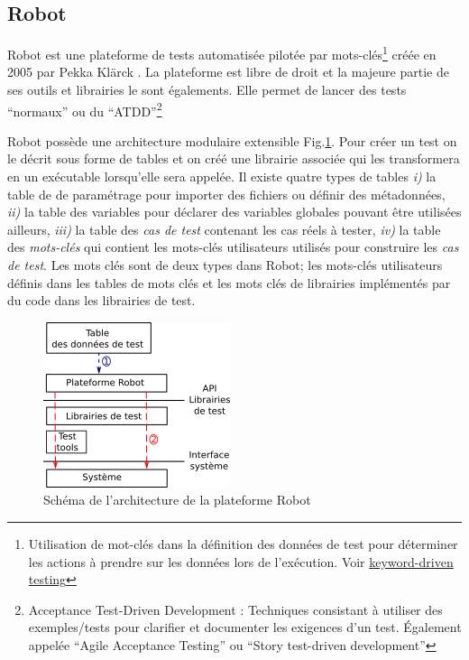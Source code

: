 \subsection{Robot}
\label{subsection:Robot}

Robot \citep{ROBOT_web} est une plateforme de tests automatisée pilotée par mots-clés\footnote{Utilisation de mot-clés dans la définition des données de test pour déterminer les actions à prendre sur les données lors de l'exécution. Voir \href{https://en.wikipedia.org/wiki/Keyword-driven\_testing}{keyword-driven testing}} créée en 2005 par Pekka Klärck \citep{ROBOTlaukkanen2006data}. La plateforme est libre de droit et la majeure partie de ses outils et librairies le sont égalements. Elle permet de lancer des tests ``normaux'' ou du ``ATDD''\footnote{Acceptance Test-Driven Development \citep{ROBOTlarman2010practices}: Techniques consistant à utiliser des exemples/tests pour clarifier et documenter les exigences d'un test. Également appelée ``Agile Acceptance Testing'' ou ``Story test-driven development''}

Robot possède une architecture modulaire extensible
Fig.\ref{Robot_arch}.  Pour créer un test on le décrit sous forme de
tables et on créé une librairie associée qui les transformera en un
exécutable lorsqu'elle sera appelée. Il existe quatre types de tables
\textit{i)} la table de de paramétrage pour importer des fichiers ou
définir des métadonnées, \textit{ii)} la table des variables pour
déclarer des variables globales pouvant être utilisées ailleurs,
\textit{iii)} la table des \textit{cas de test} contenant les cas
réels à tester, \textit{iv)} la table des \textit{mots-clés} qui
contient les mots-clés utilisateurs utilisés pour construire les
\textit{cas de test}.  Les mots clés sont de deux types dans Robot;
les mots-clés utilisateurs définis dans les tables de mots clés et les
mots clés de librairies implémentés par du code dans les librairies de
test.

\begin{figure}[H]
  \centering
  \includegraphics{Pictures/png/Robot_architecture}
  \caption{Schéma de l'architecture de la plateforme Robot}
  \label{Robot_arch}
\end{figure}

